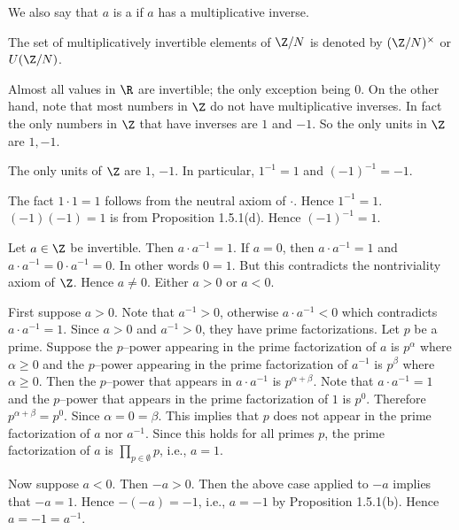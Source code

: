 \begin{defn}
We also say that $a$ is a  if $a$ has a multiplicative inverse.
\end{defn}

\begin{defn}
The set of multiplicatively invertible elements of $\Z/N$
is denoted by $(\Z/N)^\times$ or $U(\Z/N)$.
\end{defn}

Almost all values in $\R$ are invertible;
the only exception being $0$.
On the other hand, note that most numbers in $\Z$ do not have multiplicative
inverses.
In fact the only numbers in $\Z$ that have inverses are $1$ and $-1$.
So the only units in $\Z$ are $1, -1$.

\begin{prop}
  The only units of $\Z$ are $1$, $-1$.
  In particular, $1^{-1} = 1$ and $(-1)^{-1} = -1$.
\end{prop}
\proof
The fact $1 \cdot 1 = 1$ follows from the neutral axiom of $\cdot$.
Hence $1^{-1} = 1$.
$(-1)(-1) = 1$ is from Proposition 1.5.1(d).
Hence $(-1)^{-1} = 1$.

Let $a \in \Z$ be invertible.
Then $a \cdot a^{-1} = 1$.
If $a = 0$, then $a \cdot a^{-1} = 1$ and $a \cdot a^{-1} = 0 \cdot a^{-1} = 0$.
In other words $0 = 1$.
But this contradicts the nontriviality axiom of $\Z$.
Hence $a \neq 0$.
Either $a > 0$ or $a < 0$.

First suppose $a > 0$. 
Note that $a^{-1} > 0$, otherwise $a \cdot a^{-1} < 0$ which contradicts $a \cdot a^{-1} = 1$.
Since $a > 0$ and $a^{-1} > 0$, they have prime factorizations.
Let $p$ be a prime.
Suppose the $p$--power appearing in the prime factorization of $a$ is $p^\alpha$ where $\alpha \geq 0$
and the $p$--power appearing in the prime factorization of $a^{-1}$ is $p^\beta$  where $\alpha \geq 0$.
Then the $p$--power that appears in $a \cdot a^{-1}$ is $p^{\alpha + \beta}$.
Note that $a \cdot a^{-1} = 1$ and
the $p$--power that appears in the prime factorization of $1$ is $p^0$.
Therefore $p^{\alpha + \beta} = p^0$.
Since $\alpha = 0 = \beta$.
This implies that $p$ does not appear in the prime factorization of $a$ nor $a^{-1}$.
Since this holds for all primes $p$, the prime factorization of $a$ is $\prod_{p \in \emptyset} p$, i.e., $a = 1$.

Now suppose $a < 0$.
Then $-a > 0$.
Then the above case applied to $-a$ implies that $-a = 1$.
Hence $-(-a) = -1$, i.e., $a = -1$ by Proposition 1.5.1(b).
Hence $a = -1 = a^{-1}$.

